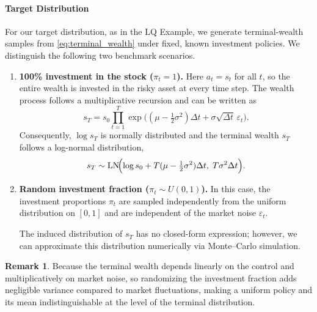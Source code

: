 \documentclass[reqno, 11pt]{amsart}%
\theoremstyle{definition}
\newtheorem{remark}[theorem]{Remark}
\begin{document}
\paragraph{Target Distribution}

For our target distribution, as in the LQ Example, we generate terminal-wealth samples from \eqref{eq:terminal_wealth} under fixed, known investment policies.
We distinguish the following two benchmark scenarios.

\begin{enumerate}
	
	\item \textbf{100\% investment in the stock ($\pi_t=1$).}  
	Here $a_t=s_t$ for all $t$, so the entire wealth is invested in the risky asset at every time step.
	The wealth process follows a multiplicative recursion and can be written as
	\[
	s_T
	= s_0 \prod_{t=1}^T \exp\!\bigl((\mu-\tfrac12\sigma^2)\Delta t
	+ \sigma \sqrt{\Delta t}\,\varepsilon_t \bigr).
	\]
	Consequently, $\log s_T$ is normally distributed and the terminal wealth $s_T$ follows a log-normal distribution,
	\[
	s_T \sim \mathrm{LN}\!\Bigl(
	\log s_0 + T(\mu-\tfrac12\sigma^2)\Delta t,
	\; T\sigma^2\Delta t
	\Bigr).
	\]

	\item \textbf{Random investment fraction ($\pi_t\sim U(0,1)$).}  
	In this case, the investment proportions $\pi_t$ are sampled independently from the uniform distribution on $[0,1]$ and are independent of the market noise $\varepsilon_t$.
	
	The induced distribution of $s_T$ has no closed-form expression; however, we can approximate	this distribution  numerically via Monte--Carlo simulation. 
\end{enumerate}
  
\begin{remark}
\label{re:terminal_wealth}
    Because the terminal wealth depends linearly on the control and multiplicatively on market noise, so randomizing the investment fraction adds negligible variance compared to market fluctuations, making a uniform policy and its mean indistinguishable at the level of the terminal distribution.
\end{remark}

 
\end{document}
